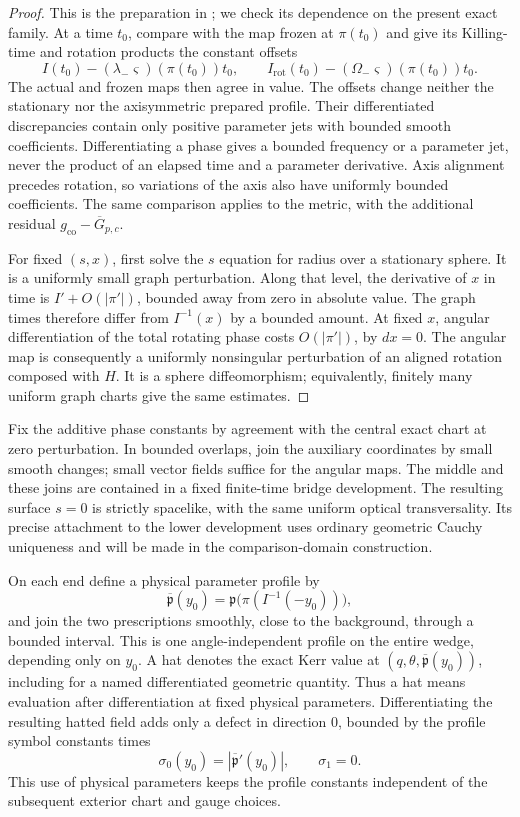 \begin{proof}
This is the preparation in ; we check its dependence on
the present exact family. At a time $t_0$, compare with the map frozen
at $\pi(t_0)$ and give its Killing-time and rotation products the
constant offsets
\[
 I(t_0)-(\lambda_-\varsigma)(\pi(t_0))t_0,
 \qquad
 I_{\mathrm{rot}}(t_0)-(\Omega_-\varsigma)(\pi(t_0))t_0.
\]
The actual and frozen maps then agree in value. The offsets change
neither the stationary nor the axisymmetric prepared profile.
Their differentiated discrepancies contain only positive parameter
jets with bounded smooth coefficients. Differentiating a phase gives
a bounded frequency or a parameter jet, never the product of an
elapsed time and a parameter derivative. Axis alignment precedes
rotation, so variations of the axis also have uniformly bounded
coefficients. The same comparison applies to the metric, with the
additional residual $g_{\mathrm{co}}-\overline G_{p,c}$.

For fixed $(s,x)$, first solve the $s$ equation for radius over a
stationary sphere. It is a uniformly small graph perturbation.
Along that level, the derivative of $x$ in time is
$I'+O(|\pi'|)$, bounded away from zero in absolute value.
The graph times therefore differ from $I^{-1}(x)$ by a bounded
amount. At fixed $x$, angular differentiation of the total rotating
phase costs $O(|\pi'|)$, by $dx=0$. The angular map is consequently
a uniformly nonsingular perturbation of an aligned rotation composed
with $H$. It is a sphere diffeomorphism; equivalently, finitely many
uniform graph charts give the same estimates.
\end{proof}

Fix the additive phase constants by agreement with the central exact
chart at zero perturbation. In bounded overlaps, join the auxiliary
coordinates by small smooth changes; small vector fields suffice for
the angular maps. The middle and these joins are contained in a fixed
finite-time bridge development. The resulting surface $s=0$ is
strictly spacelike, with the same uniform optical transversality.
Its precise attachment to the lower development uses ordinary
geometric Cauchy uniqueness and will be made in the comparison-domain
construction.

On each end define a physical parameter profile by
\begin{equation}\label{in:parameter-profile}
 \overline{\mathfrak p}(y_0)
   =\mathfrak p\bigl(\pi(I^{-1}(-y_0))\bigr),
\end{equation}
and join the two prescriptions smoothly, close to the background,
through a bounded interval. This is one angle-independent profile on
the entire wedge, depending only on $y_0$. A hat denotes the exact
Kerr value at $(q,\theta,\overline{\mathfrak p}(y_0))$,
including for a named differentiated geometric quantity. Thus a hat
means evaluation after differentiation at fixed physical parameters.
Differentiating the resulting hatted field adds only a defect in
direction $0$, bounded by the profile symbol constants times
\[
 \sigma_0(y_0)=|\overline{\mathfrak p}'(y_0)|,
 \qquad \sigma_1=0.
\]
This use of physical parameters keeps the profile constants independent
of the subsequent exterior chart and gauge choices.

